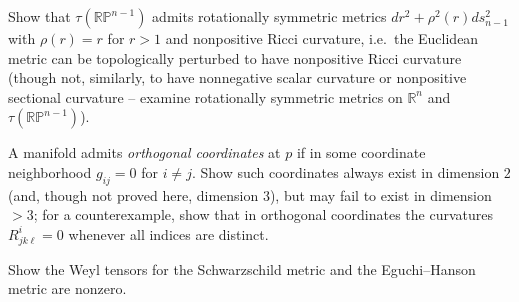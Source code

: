 \begin{remark}
  \label{rem:pet-ch4-ex-25}

  Show that $\tau(\mathbb{RP}^{n-1})$ admits rotationally symmetric metrics
  $dr^2+\rho^2(r)ds_{n-1}^2$ with $\rho(r)=r$ for $r>1$ and nonpositive Ricci
  curvature, i.e.\ the Euclidean metric can be topologically perturbed to have
  nonpositive Ricci curvature (though not, similarly, to have nonnegative
  scalar curvature or nonpositive sectional curvature -- examine rotationally
  symmetric metrics on $\mathbb{R}^n$ and $\tau(\mathbb{RP}^{n-1})$).
\end{remark}

\begin{remark}
  \label{rem:pet-ch4-ex-26}

  A manifold admits \emph{orthogonal coordinates} at $p$ if in some coordinate
  neighborhood $g_{ij}=0$ for $i\ne j$. Show such coordinates always exist in
  dimension $2$ (and, though not proved here, dimension $3$), but may fail to
  exist in dimension $>3$; for a counterexample, show that in orthogonal
  coordinates the curvatures $R^i_{jk\ell}=0$ whenever all indices are
  distinct.
\end{remark}

\begin{remark}
  \label{rem:pet-ch4-ex-27}

  Show the Weyl tensors for the Schwarzschild metric and the Eguchi--Hanson
  metric are nonzero.
\end{remark}

